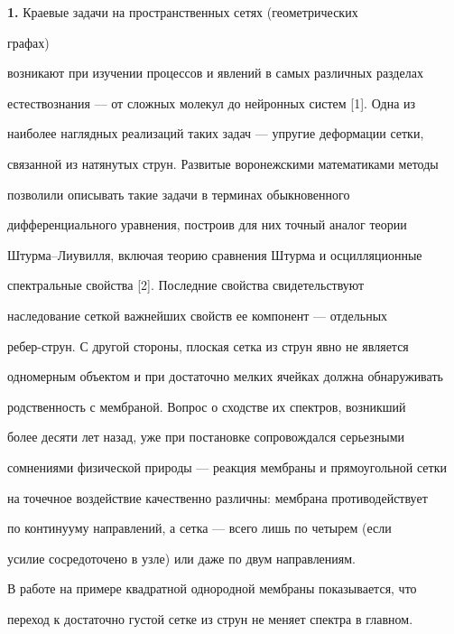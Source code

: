 \maketitle 


\label{begin} 


 


{\bf 1.} Краевые задачи на пространственных сетях (геометрических 


графах) 


возникают при изучении процессов и явлений в самых различных разделах 


естествознания --- от сложных молекул до нейронных систем [1]. Одна из 


наиболее наглядных реализаций таких задач --- упругие деформации сетки, 


связанной из натянутых струн. Развитые воронежскими математиками методы 


позволили описывать такие задачи в терминах обыкновенного 


дифференциального уравнения, построив для них точный аналог теории 


Штурма--Лиувилля, включая теорию сравнения Штурма и осцилляционные 


спектральные свойства [2]. Последние свойства свидетельствуют 


наследование сеткой важнейших свойств ее компонент --- отдельных 


ребер-струн. С другой стороны, плоская сетка из струн явно не является 


одномерным объектом и при достаточно мелких ячейках должна обнаруживать 


родственность с мембраной. Вопрос о сходстве их спектров, возникший 


более десяти лет назад, уже при постановке сопровождался серьезными 


сомнениями физической природы --- реакция мембраны и прямоугольной сетки 


на точечное воздействие качественно различны: мембрана противодействует 


по континууму направлений, а сетка --- всего лишь по четырем (если 


усилие сосредоточено в узле) или даже по двум направлениям. 


 


В работе на примере квадратной однородной мембраны показывается, что 


переход к достаточно густой сетке из струн не меняет спектра в главном. 


